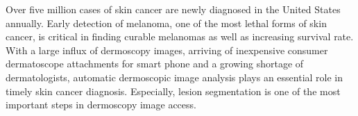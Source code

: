\documentclass{article}
\begin{document}
Over five million cases of skin cancer are newly diagnosed in the United States annually\cite{Siegel16-Nature}. Early detection of melanoma, one of the most lethal forms of skin cancer, is critical in finding curable melanomas as well as increasing survival rate\cite{Freedberg1999738,Charles2001}. With a large influx of dermoscopy images, arriving of inexpensive consumer dermatoscope attachments for smart phone\cite{MoleScope} and a growing shortage of dermatologists\cite{Kimball2008741}, automatic dermoscopic image analysis plays an essential role in timely skin cancer diagnosis. Especially, lesion segmentation is one of the most important steps in dermoscopy image access.   
\end{document}
